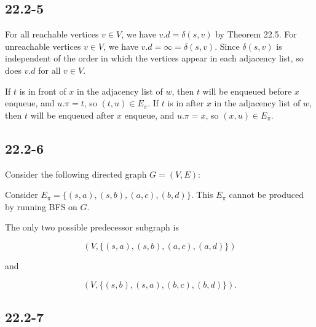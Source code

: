 \subsection*{22.2-5}

For all reachable vertices $v \in V$,
we have $v.d = \delta(s,v)$ by Theorem 22.5.
For unreachable vertices $v \in V$,
we have $v.d = \infty = \delta(s,v)$.
Since $\delta(s,v)$ is independent of the order in which
the vertices appear in each adjacency list,
so does $v.d$ for all $v \in V$.

If $t$ is in front of $x$ in the adjacency list of $w$,
then $t$ will be enqueued before $x$ enqueue,
and $u.\pi = t$, so $(t,u) \in E_\pi$.
If $t$ is in after $x$ in the adjacency list of $w$,
then $t$ will be enqueued after $x$ enqueue,
and $u.\pi = x$, so $(x,u) \in E_\pi$.

\subsection*{22.2-6}

Consider the following directed graph $G = (V,E)$:


Consider $E_\pi = \{ (s,a), (s,b), (a,c), (b,d) \}$.
This $E_\pi$ cannot be produced by running BFS on $G$.

The only two possible predecessor subgraph is

\begin{equation*}
    (V, \{ (s,a), (s,b), (a,c), (a,d) \})
\end{equation*}

and

\begin{equation*}
    (V, \{ (s,b), (s,a), (b,c), (b,d) \}).
\end{equation*}

\subsection*{22.2-7}

